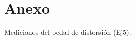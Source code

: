 \documentclass[main.tex]{subfiles}
\begin{document}
\section{Anexo}

Mediciones del pedal de distorsión (Ej5). \par

	\begin{figure}[H]
	\centering
	\end{figure}
	
	
	
\end{document}
